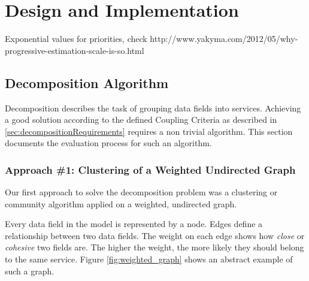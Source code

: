 
\chapter{Design and Implementation}
\label{cha:implementation}

Exponential values for priorities, check http://www.yakyma.com/2012/05/why-progressive-estimation-scale-is-so.html


\section{Decomposition Algorithm}

Decomposition describes the task of grouping data fields into services. Achieving a good solution according to the defined Coupling Criteria as described in \ref{sec:decompositionRequirements} requires a non trivial algorithm. This section documents the evaluation process for such an algorithm.

\subsection{Approach \#1: Clustering of a Weighted Undirected Graph}
\label{subsec:approach1_graph}

Our first approach to solve the decomposition problem was a clustering or community algorithm applied on a weighted, undirected graph.

Every data field in the model is represented by a node. Edges define a relationship between two data fields. The weight on each edge shows how \textit{close} or \textit{cohesive} two fields are. The higher the weight, the more likely they should belong to the same service. Figure \ref{fig:weighted_graph} shows an abstract example of such a graph.

